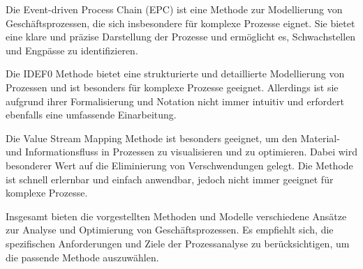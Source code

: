 \documentclass[11pt,a4paper]{scrartcl}
\begin{document}
Die Event-driven Process Chain (EPC) ist eine Methode zur Modellierung von Geschäftsprozessen, die sich insbesondere für komplexe Prozesse eignet. Sie bietet eine klare und präzise Darstellung der Prozesse und ermöglicht es, Schwachstellen und Engpässe zu identifizieren.

Die IDEF0 Methode bietet eine strukturierte und detaillierte Modellierung von Prozessen und ist besonders für komplexe Prozesse geeignet. Allerdings ist sie aufgrund ihrer Formalisierung und Notation nicht immer intuitiv und erfordert ebenfalls eine umfassende Einarbeitung.

Die Value Stream Mapping Methode ist besonders geeignet, um den Material- und Informationsfluss in Prozessen zu visualisieren und zu optimieren. Dabei wird besonderer Wert auf die Eliminierung von Verschwendungen gelegt. Die Methode ist schnell erlernbar und einfach anwendbar, jedoch nicht immer geeignet für komplexe Prozesse.

Insgesamt bieten die vorgestellten Methoden und Modelle verschiedene Ansätze zur Analyse und Optimierung von Geschäftsprozessen. Es empfiehlt sich, die spezifischen Anforderungen und Ziele der Prozessanalyse zu berücksichtigen, um die passende Methode auszuwählen.
\end{document}
